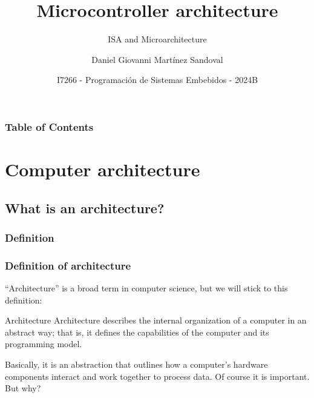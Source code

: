 \documentclass[aspectratio=169]{beamer}
\title[Microcontroller architecture] %
{Microcontroller architecture}
\subtitle{ISA and Microarchitecture}
\author{Daniel Giovanni Martínez Sandoval}
\institute[CUCEI - UDG]
{
  \textsc{
    \textbf{Universidad de Guadalajara}\\
    {\tiny Centro Universitario de Ciencias Exactas e Ingenierías}
  }
}
\date[September 2024] %
{\footnotesize I7266 - Programación de Sistemas Embebidos - 2024B }
\begin{document}
\frame{\titlepage}

\begin{frame}
\frametitle{Table of Contents}
\tableofcontents
\end{frame}


\section{Computer architecture}
\subsection{What is an architecture?}
\subsubsection{Definition}
\begin{frame}
  \frametitle{Definition of architecture}
  ``Architecture'' is a broad term in computer science, but we will stick to this definition: \pause
  \begin{block}{Architecture}
    Architecture describes the internal organization of a computer in an abstract way; that is, it deﬁnes the capabilities of the computer and its programming model.\cite{clements} \pause
  \end{block}
  Basically, it is an abstraction that outlines how a computer's hardware components interact and work together to process data. Of course it is important. But why?
  \end{frame}
\end{document}
